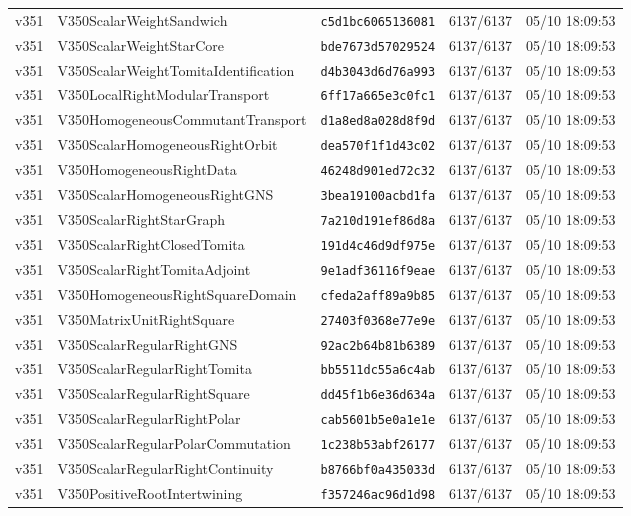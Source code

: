 \documentclass[11pt]{article}
\theoremstyle{definition}\newtheorem{deriv}{Derivação}
\begin{document}
{\begin{longtable}{@{}lllll@{}}
v351 & V350ScalarWeightSandwich & \texttt{c5d1bc6065136081} & 6137/6137 & 05/10 18:09:53 \\
v351 & V350ScalarWeightStarCore & \texttt{bde7673d57029524} & 6137/6137 & 05/10 18:09:53 \\
v351 & V350ScalarWeightTomitaIdentification & \texttt{d4b3043d6d76a993} & 6137/6137 & 05/10 18:09:53 \\
v351 & V350LocalRightModularTransport & \texttt{6ff17a665e3c0fc1} & 6137/6137 & 05/10 18:09:53 \\
v351 & V350HomogeneousCommutantTransport & \texttt{d1a8ed8a028d8f9d} & 6137/6137 & 05/10 18:09:53 \\
v351 & V350ScalarHomogeneousRightOrbit & \texttt{dea570f1f1d43c02} & 6137/6137 & 05/10 18:09:53 \\
v351 & V350HomogeneousRightData & \texttt{46248d901ed72c32} & 6137/6137 & 05/10 18:09:53 \\
v351 & V350ScalarHomogeneousRightGNS & \texttt{3bea19100acbd1fa} & 6137/6137 & 05/10 18:09:53 \\
v351 & V350ScalarRightStarGraph & \texttt{7a210d191ef86d8a} & 6137/6137 & 05/10 18:09:53 \\
v351 & V350ScalarRightClosedTomita & \texttt{191d4c46d9df975e} & 6137/6137 & 05/10 18:09:53 \\
v351 & V350ScalarRightTomitaAdjoint & \texttt{9e1adf36116f9eae} & 6137/6137 & 05/10 18:09:53 \\
v351 & V350HomogeneousRightSquareDomain & \texttt{cfeda2aff89a9b85} & 6137/6137 & 05/10 18:09:53 \\
v351 & V350MatrixUnitRightSquare & \texttt{27403f0368e77e9e} & 6137/6137 & 05/10 18:09:53 \\
v351 & V350ScalarRegularRightGNS & \texttt{92ac2b64b81b6389} & 6137/6137 & 05/10 18:09:53 \\
v351 & V350ScalarRegularRightTomita & \texttt{bb5511dc55a6c4ab} & 6137/6137 & 05/10 18:09:53 \\
v351 & V350ScalarRegularRightSquare & \texttt{dd45f1b6e36d634a} & 6137/6137 & 05/10 18:09:53 \\
v351 & V350ScalarRegularRightPolar & \texttt{cab5601b5e0a1e1e} & 6137/6137 & 05/10 18:09:53 \\
v351 & V350ScalarRegularPolarCommutation & \texttt{1c238b53abf26177} & 6137/6137 & 05/10 18:09:53 \\
v351 & V350ScalarRegularRightContinuity & \texttt{b8766bf0a435033d} & 6137/6137 & 05/10 18:09:53 \\
v351 & V350PositiveRootIntertwining & \texttt{f357246ac96d1d98} & 6137/6137 & 05/10 18:09:53 \\

\end{longtable}}
\end{document}
